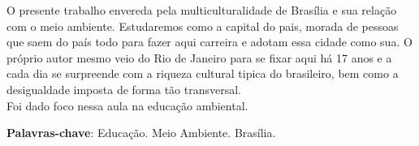 
\setlength{\absparsep}{18pt} %
\begin{resumo}
 O presente trabalho envereda pela multiculturalidade de Brasília e sua relação com o meio ambiente. Estudaremos como a capital do pais, morada de pessoas que saem do país todo para fazer aqui carreira e adotam essa cidade como sua. O próprio autor mesmo veio do Rio de Janeiro para se fixar aqui há 17 anos e a cada dia se surpreende com a riqueza cultural tipica do brasileiro, bem como a desigualdade imposta de forma tão transversal. \\
 Foi dado foco nessa aula na educação ambiental.

 \textbf{Palavras-chave}: Educação. Meio Ambiente. Brasília.
\end{resumo}
\makeglossaries